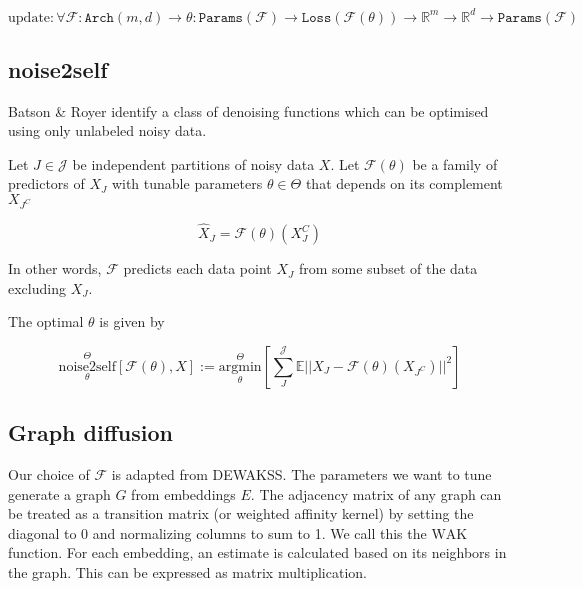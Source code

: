 \documentclass{article}
\begin{document}
\begin{equation}
  \mathrm{update} : \forall \mathcal{F}:\mathtt{Arch}(m,d) \to \theta:\mathtt{Params}(\mathcal{F}) \to \mathtt{Loss}(\mathcal{F}(\theta)) \to \mathbb{R}^m \to \mathbb{R}^d \to \mathtt{Params}(\mathcal{F})
\end{equation}




\subsection{noise2self}

Batson \& Royer\cite{batson2019noise2self} identify a class of denoising functions which can be optimised using only unlabeled noisy data.

Let $J \in \mathcal{J}$ be independent partitions of noisy data $X$. Let $\mathcal{F}(\theta)$ be a family of predictors of $X_J$ with tunable parameters $\theta \in \Theta$ that depends on its complement $X_{J^C}$

\begin{equation}
  \hat{X}_J=\mathcal{F}(\theta)(X_J^C)
\end{equation}

In other words, $\mathcal{F}$ predicts each data point $X_J$ from some subset of the data excluding $X_J$. 

  The optimal $\theta$ is given by

\begin{equation}
  \underset{\theta}{\overset{\Theta}{\mathrm{noise2self}}}[\mathcal{F}(\theta),X] := \underset{\theta}{\overset{\Theta}{\mathrm{argmin}}}[\sum_{J}^{\mathcal{J}}\mathbb{E}||X_J-\mathcal{F}(\theta)(X_{J^C})||^2]
\end{equation}



\subsection{Graph diffusion}

Our choice of $\mathcal{F}$ is adapted from DEWAKSS\cite{tjarnberg2021}. The parameters we want to tune generate a graph $G$ from embeddings $E$. The adjacency matrix of any graph can be treated as a transition matrix (or weighted affinity kernel) by setting the diagonal to 0 and normalizing columns to sum to 1. We call this the $\mathrm{WAK}$ function. For each embedding, an estimate is calculated based on its neighbors in the graph. This can be expressed as matrix multiplication.
\end{document}
